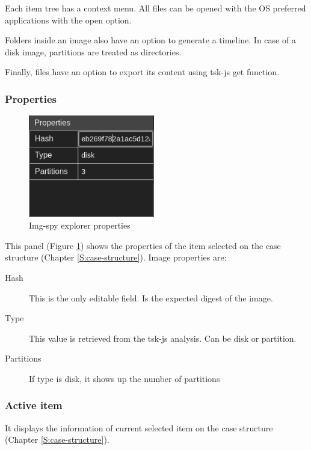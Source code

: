 Each item tree has a context menu. All files can be opened with the OS
preferred applications with the open option.

Folders inside an image also have an option to generate a timeline. In case of
a disk image, partitions are treated as directories.

Finally, files have an option to export its content using tsk-js get function.

\subsubsection{Properties}
\label{S:explorer-properties}

\begin{figure}
	\includegraphics[width=5.5cm]{./figures/explorer-properties.png}
	\centering
	\caption{Img-spy explorer properties}
	\label{F:img-spy-explorer-properties}
\end{figure}

This panel (Figure \ref{F:img-spy-explorer-properties}) shows the properties of
the item selected on the case structure (Chapter \ref{S:case-structure}).
Image properties are:

\begin{description}
	\item[Hash] This is the only editable field. Is the expected digest of the 
	image. 

	\item[Type] This value is retrieved from the tsk-js analysis. Can be disk
	or partition.
	
	\item[Partitions] If type is disk, it shows up the number of partitions
\end{description}

\subsubsection{Active item}

It displays the information of current selected item on the case structure (Chapter
\ref{S:case-structure}).

